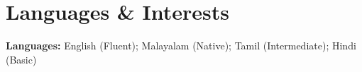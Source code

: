 \section{\textbf{Languages \& Interests}}
\vspace{-0.4mm}
{\small
\noindent\textbf{Languages:} English (Fluent); Malayalam (Native); Tamil (Intermediate); Hindi (Basic)
}\vspace{-6mm}